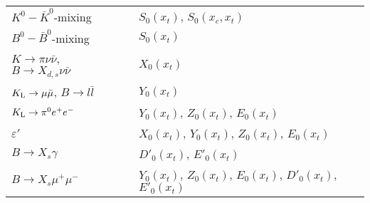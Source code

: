 \documentclass[12pt,rotate]{article}
\begin{document}
\begin{itemize}
\begin{center}
\begin{tabular}{lcl}
$K^0-\bar K^0$-mixing &\qquad\qquad& $S_0(x_t)$, $S_0(x_c,x_t)$ \\
$B^0-\bar B^0$-mixing &\qquad\qquad& $S_0(x_t)$ \\
$K \to \pi \nu \bar\nu$, $B \to X_{d,s} \nu \bar\nu$ 
&\qquad\qquad& $X_0(x_t)$ \\
$K_{\rm L}\to \mu \bar\mu$, $B \to l\bar l$ &\qquad\qquad& $Y_0(x_t)$ \\
$K_{\rm L} \to \pi^0 e^+ e^-$ &\qquad\qquad& $Y_0(x_t)$, $Z_0(x_t)$, 
$E_0(x_t)$ \\
$\varepsilon'$ &\qquad\qquad& $X_0(x_t)$, $Y_0(x_t)$, $Z_0(x_t)$,
$E_0(x_t)$ \\
$B \to X_s \gamma$ &\qquad\qquad& $D'_0(x_t)$, $E'_0(x_t)$ \\
$B \to X_s \mu^+ \mu^-$ &\qquad\qquad&
$Y_0(x_t)$, $Z_0(x_t)$, $E_0(x_t)$, $D'_0(x_t)$, $E'_0(x_t)$
\end{tabular}
\end{center}


\end{itemize}
\end{document}
